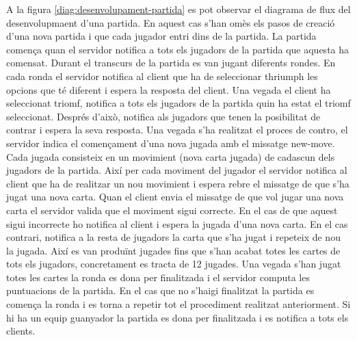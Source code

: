 A la figura \ref{diag:desenvolupament-partida} es pot observar el diagrama de flux del desenvolupmaent d'una partida. En aquest cas s'han omès els pasos de creació d'una nova partida i que cada jugador entri dins de la partida. La partida comença quan el servidor notifica a tots els jugadors de la partida que aquesta ha comensat. Durant el transcurs de la partida es van jugant diferents rondes. En cada ronda el servidor notifica al client que ha de seleccionar thriumph les opcions que té diferent i espera la resposta del client. Una vegada el client ha seleccionat triomf, notifica a tots els jugadors de la partida quin ha estat el triomf seleccionat. Després d'això, notifica als jugadors que tenen la posibilitat de contrar i espera la seva resposta. Una vegada s'ha realitzat el proces de contro, el servidor indica el començament d'una nova jugada amb el missatge new-move. Cada jugada consisteix en un movimient (nova carta jugada) de cadascun dels jugadors de la partida. Així per cada moviment del jugador el servidor notifica al client que ha de realitzar un nou movimient i espera rebre el missatge de que s'ha jugat una nova carta. Quan el client envia el missatge de que vol jugar una nova carta el servidor valida que el moviment sigui correcte. En el cas de que aquest sigui incorrecte ho notifica al client i espera la jugada d'una nova carta. En el cas contrari, notifica a la resta de jugadors la carta que s'ha jugat i repeteix de nou la jugada. Així es van produïnt jugades fins que s'han acabat totes les cartes de tots els jugadors, concretament es tracta de 12 jugades. Una vegada s'han jugat totes les cartes la ronda es dona per finalitzada i el servidor computa les puntuacions de la partida. En el cas que no s'haigi finalitzat la partida es comença la ronda i es torna a repetir tot el procediment realitzat anteriorment. Si hi ha un equip guanyador la partida es dona per finalitzada i es notifica a tots els clients. 


